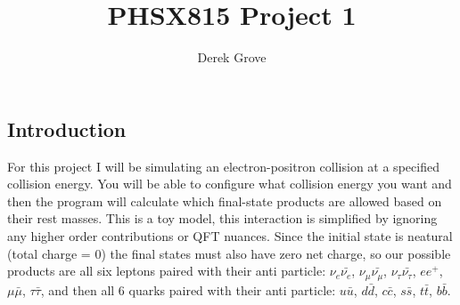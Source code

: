 \documentclass[11pt]{article}
\title{PHSX815 Project 1}
\author{Derek Grove}
\begin{document}
\maketitle
\subsection*{Introduction}
For this project I will be simulating an electron-positron collision at a specified collision energy. You will be able to configure what collision energy you want and then the program will calculate which final-state products are allowed based on their rest masses. This is a toy model, this interaction is simplified by ignoring any higher order contributions or QFT nuances. Since the initial state is neatural (total charge = 0) the final states must also have zero net charge, so our possible products are all six leptons paired with their anti particle: $\nu_e\bar{\nu_e}$, $\nu_\mu\bar{\nu_\mu}$, $\nu_\tau\bar{\nu_\tau}$, $ee^+$, $\mu\bar{\mu}$, $\tau\bar{\tau}$, and then all 6 quarks paired with their anti particle: $u\bar{u}$, $d\bar{d}$, $c\bar{c}$, $s\bar{s}$, $t\bar{t}$, $b\bar{b}$.
\end{document}
